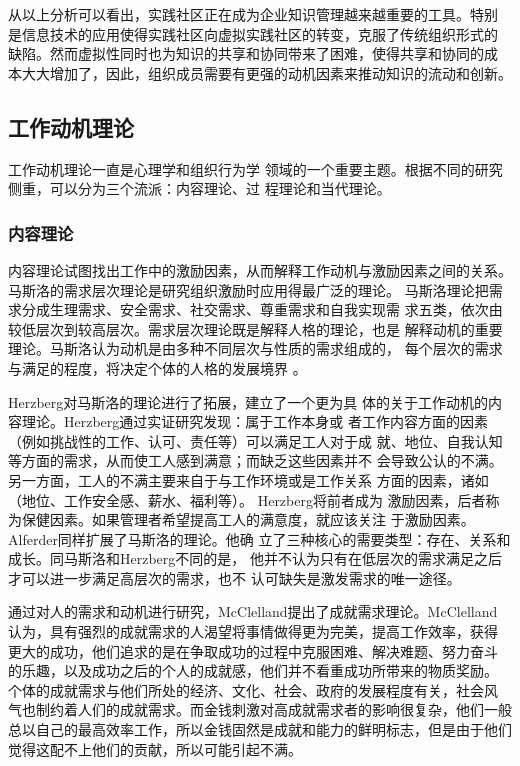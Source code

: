 \documentclass[12pt,a4paper,cs4size]{ctexart}
\begin{document}
从以上分析可以看出，实践社区正在成为企业知识管理越来越重要的工具。特别
是信息技术的应用使得实践社区向虚拟实践社区的转变，克服了传统组织形式的
缺陷。然而虚拟性同时也为知识的共享和协同带来了困难，使得共享和协同的成
本大大增加了，因此，组织成员需要有更强的动机因素来推动知识的流动和创新。



\subsection{工作动机理论}
工作动机理论一直是心理学和组织行为学
领域的一个重要主题。根据不同的研究侧重，可以分为三个流派：内容理论、过
程理论和当代理论。

\subsubsection{内容理论}
内容理论试图找出工作中的激励因素，从而解释工作动机与激励因素之间的关系。
马斯洛的需求层次理论是研究组织激励时应用得最广泛的理论。
马斯洛理论把需求分成生理需求、安全需求、社交需求、尊重需求和自我实现需
求五类，依次由较低层次到较高层次。需求层次理论既是解释人格的理论，也是
解释动机的重要理论。马斯洛认为动机是由多种不同层次与性质的需求组成的，
每个层次的需求与满足的程度，将决定个体的人格的发展境界
\cite{Maslow1943}。

Herzberg对马斯洛的理论进行了拓展，建立了一个更为具
体的关于工作动机的内容理论。Herzberg通过实证研究发现：属于工作本身或
者工作内容方面的因素（例如挑战性的工作、认可、责任等）可以满足工人对于成
就、地位、自我认知等方面的需求，从而使工人感到满意；而缺乏这些因素并不
会导致公认的不满。另一方面，工人的不满主要来自于与工作环境或是工作关系
方面的因素，诸如（地位、工作安全感、薪水、福利等）。
Herzberg将前者成为
激励因素，后者称为保健因素。如果管理者希望提高工人的满意度，就应该关注
于激励因素\cite{hertzberg1959mw}。Alferder同样扩展了马斯洛的理论。他确
立了三种核心的需要类型：存在、关系和成长。同马斯洛和Herzberg不同的是，
他并不认为只有在低层次的需求满足之后才可以进一步满足高层次的需求，也不
认可缺失是激发需求的唯一途径\cite{alderfer:era}。

通过对人的需求和动机进行研究，McClelland提出了成就需求理论。McClelland
认为，具有强烈的成就需求的人渴望将事情做得更为完美，提高工作效率，获得
更大的成功，他们追求的是在争取成功的过程中克服困难、解决难题、努力奋斗
的乐趣，以及成功之后的个人的成就感，他们并不看重成功所带来的物质奖励。
个体的成就需求与他们所处的经济、文化、社会、政府的发展程度有关，社会风
气也制约着人们的成就需求。而金钱刺激对高成就需求者的影响很复杂，他们一般总以自己的最高效率工作，所以金钱固然是成就和能力的鲜明标志，但是由于他们觉得这配不上他们的贡献，所以可能引起不满\cite{mcclelland1976am}。
\end{document}
